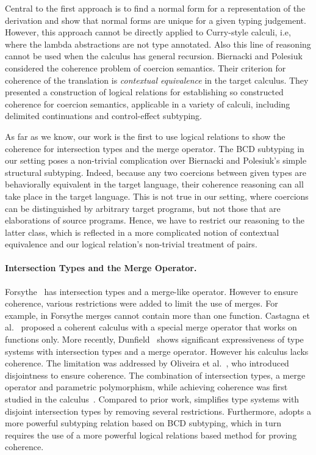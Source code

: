 Central to the first approach is to find a normal form for a representation of
the derivation and show that normal forms are unique for a given typing
judgement. However, this approach cannot be directly applied to Curry-style
calculi, i.e, where the lambda abstractions are not type annotated. Also this
line of reasoning cannot be used when the calculus has general recursion.
Biernacki and Polesiuk~\citep{biernacki2015logical} considered the coherence
problem of coercion semantics. Their criterion for coherence of the translation is
\textit{contextual equivalence} in the target calculus. They presented a construction of
logical relations for establishing so constructed coherence for coercion semantics,
applicable in a variety of calculi, including delimited continuations and
control-effect subtyping.

As far as we know, our work is the first to use logical relations
to show the coherence for intersection types and the merge operator. The BCD
subtyping in our setting poses a non-trivial complication over Biernacki and
Polesiuk's simple structural subtyping. Indeed, because any two coercions
between given types are behaviorally equivalent in the target language, their
coherence reasoning can all take place in the target language. This is not true
in our setting, where coercions can be distinguished by arbitrary target
programs, but not those that are elaborations of source programs. Hence, we have to
restrict our reasoning to the latter class, which is reflected in a more
complicated notion of contextual equivalence and our logical relation's
non-trivial treatment of pairs.

\paragraph{Intersection Types and the Merge Operator.}
Forsythe~\citep{reynolds1988preliminary} has intersection types and a merge-like operator. However to ensure coherence, various
restrictions were added to limit the use of merges. For example, in Forsythe
merges cannot contain more than one function. Castagna et al.~\citep{Castagna_1992} proposed a
coherent calculus with a special merge operator that works on functions only.
More recently, Dunfield~\citep{dunfield2014elaborating} shows significant expressiveness
of type systems with intersection types and a merge operator. However his
calculus lacks coherence. The limitation was addressed by
Oliveira et al.~\citep{oliveira2016disjoint}, who introduced disjointness to ensure
coherence. The combination of intersection types, a merge operator and
parametric polymorphism, while achieving coherence was first studied in the
\fname calculus~\citep{alpuimdisjoint}. Compared to prior work, \name simplifies type systems
with disjoint intersection types by removing several restrictions. 
Furthermore, \name adopts a more powerful subtyping relation based 
on BCD subtyping, which in turn requires the use of a more powerful
logical relations based method for proving coherence.


